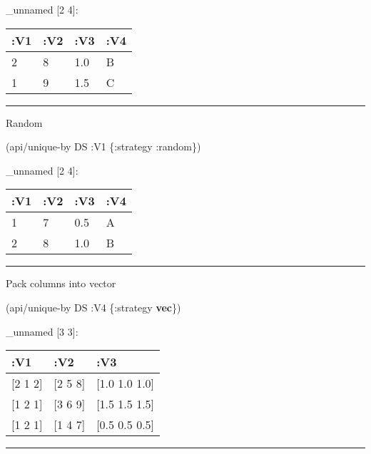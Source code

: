 \documentclass[]{article}
\newenvironment{Shaded}{\begin{snugshade}}{\end{snugshade}}
\newcommand{\AttributeTok}[1]{\textcolor[rgb]{0.77,0.63,0.00}{#1}}
\newcommand{\KeywordTok}[1]{\textcolor[rgb]{0.13,0.29,0.53}{\textbf{#1}}}
\newcommand{\NormalTok}[1]{#1}
\begin{document}
\_unnamed {[}2 4{]}:

\begin{longtable}[]{@{}llll@{}}
\toprule
:V1 & :V2 & :V3 & :V4\tabularnewline
\midrule
\endhead
2 & 8 & 1.0 & B\tabularnewline
1 & 9 & 1.5 & C\tabularnewline
\bottomrule
\end{longtable}

\begin{center}\rule{0.5\linewidth}{0.5pt}\end{center}

Random

\begin{Shaded}
\begin{Highlighting}[]
\NormalTok{(api/unique-by DS }\AttributeTok{:V1}\NormalTok{ \{}\AttributeTok{:strategy} \AttributeTok{:random}\NormalTok{\})}
\end{Highlighting}
\end{Shaded}

\_unnamed {[}2 4{]}:

\begin{longtable}[]{@{}llll@{}}
\toprule
:V1 & :V2 & :V3 & :V4\tabularnewline
\midrule
\endhead
1 & 7 & 0.5 & A\tabularnewline
2 & 8 & 1.0 & B\tabularnewline
\bottomrule
\end{longtable}

\begin{center}\rule{0.5\linewidth}{0.5pt}\end{center}

Pack columns into vector

\begin{Shaded}
\begin{Highlighting}[]
\NormalTok{(api/unique-by DS }\AttributeTok{:V4}\NormalTok{ \{}\AttributeTok{:strategy} \KeywordTok{vec}\NormalTok{\})}
\end{Highlighting}
\end{Shaded}

\_unnamed {[}3 3{]}:

\begin{longtable}[]{@{}lll@{}}
\toprule
:V1 & :V2 & :V3\tabularnewline
\midrule
\endhead
{[}2 1 2{]} & {[}2 5 8{]} & {[}1.0 1.0 1.0{]}\tabularnewline
{[}1 2 1{]} & {[}3 6 9{]} & {[}1.5 1.5 1.5{]}\tabularnewline
{[}1 2 1{]} & {[}1 4 7{]} & {[}0.5 0.5 0.5{]}\tabularnewline
\bottomrule
\end{longtable}

\begin{center}\rule{0.5\linewidth}{0.5pt}\end{center}
\end{document}
